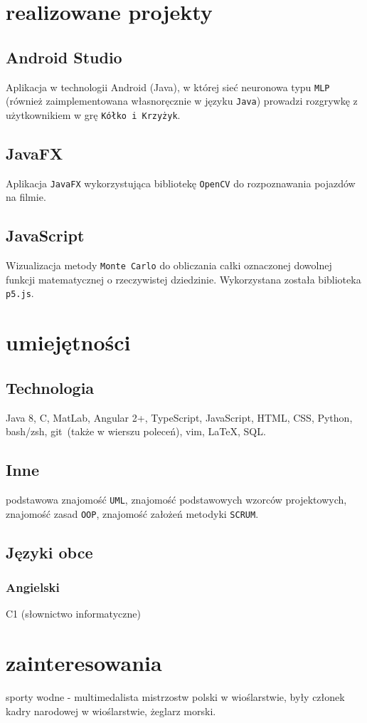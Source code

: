 \documentclass{article}
\begin{document}
\begin{minipage}[t]{.4\textwidth}

	\section{realizowane projekty}
	\subsection{Android Studio}
	Aplikacja w technologii Android (Java), w której sieć neuronowa typu \verb+MLP+ (również zaimplementowana własnoręcznie w języku \verb+Java+) prowadzi rozgrywkę z użytkownikiem w grę \verb+Kółko i Krzyżyk+.

	\subsection{JavaFX}
	Aplikacja \verb+JavaFX+ wykorzystująca bibliotekę \verb+OpenCV+ do rozpoznawania pojazdów na filmie.

	\subsection{JavaScript}
	Wizualizacja metody \verb+Monte Carlo+ do obliczania całki oznaczonej dowolnej funkcji matematycznej o rzeczywistej dziedzinie. Wykorzystana została biblioteka \verb+p5.js+.

	\vspace{1em}

	\section{umiejętności}
	\subsection{Technologia}
	Java 8, C, MatLab, Angular 2+, TypeScript, JavaScript, HTML, CSS, Python, bash/zsh, git~(także w wierszu poleceń), vim, \LaTeX, SQL.

	\subsection{Inne}
	podstawowa znajomość \verb+UML+, znajomość podstawowych wzorców projektowych, znajomość zasad \verb+OOP+, znajomość założeń metodyki \verb+SCRUM+.

	\subsection{Języki obce}
	\subsubsection{Angielski} C1 (słownictwo informatyczne)

	\vspace{1em}

	\section{zainteresowania}
	sporty wodne - multimedalista mistrzostw polski w wioślarstwie, były członek kadry narodowej w wioślarstwie, żeglarz morski.

\end{minipage}
\end{document}
